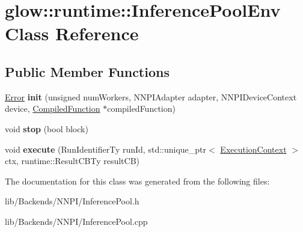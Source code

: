 \hypertarget{classglow_1_1runtime_1_1_inference_pool_env}{}\section{glow\+:\+:runtime\+:\+:Inference\+Pool\+Env Class Reference}
\label{classglow_1_1runtime_1_1_inference_pool_env}
\subsection*{Public Member Functions}
\begin{DoxyCompactItemize}
\item 
\mbox{\label{classglow_1_1runtime_1_1_inference_pool_env_a780636a0e2ad84c1d4a1dd454f9688d7}} 
\hyperlink{namespaceglow_afdb176c3a672ef66db0ecfc19a8d39bf}{Error} {\bfseries init} (unsigned num\+Workers, N\+N\+P\+I\+Adapter adapter, N\+N\+P\+I\+Device\+Context device, \hyperlink{classglow_1_1_compiled_function}{Compiled\+Function} $\ast$compiled\+Function)
\item 
\mbox{\label{classglow_1_1runtime_1_1_inference_pool_env_a6740ab28c2b5a5170eda213ae3d48c5c}} 
void {\bfseries stop} (bool block)
\item 
\mbox{\label{classglow_1_1runtime_1_1_inference_pool_env_ae0a5ab524ded7b55fa4ea3efd75cce41}} 
void {\bfseries execute} (Run\+Identifier\+Ty run\+Id, std\+::unique\+\_\+ptr$<$ \hyperlink{classglow_1_1_execution_context}{Execution\+Context} $>$ ctx, runtime\+::\+Result\+C\+B\+Ty result\+CB)
\end{DoxyCompactItemize}


The documentation for this class was generated from the following files\+:\begin{DoxyCompactItemize}
\item 
lib/\+Backends/\+N\+N\+P\+I/Inference\+Pool.\+h\item 
lib/\+Backends/\+N\+N\+P\+I/Inference\+Pool.\+cpp\end{DoxyCompactItemize}
